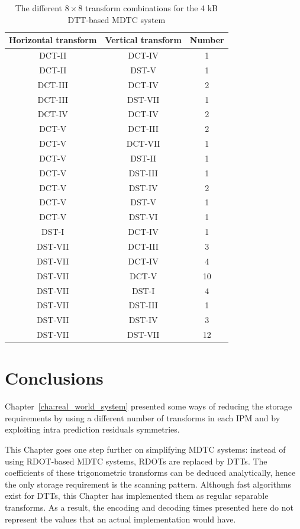 \documentclass[11pt,a4paper,openright,twoside]{book}
\numberwithin{equation}{section} %
\numberwithin{figure}{section} %
\numberwithin{table}{section} %
\begin{document}
\begin{table}[tb]
	\centering
	\small
	\begin{tabular}{cc|c}
		Horizontal transform & Vertical transform & Number \\
		\hline\hline
		DCT-II  & DCT-IV  & 1  \\
		DCT-II  & DST-V   & 1  \\
		DCT-III & DCT-IV  & 2  \\
		DCT-III & DST-VII & 1  \\
		DCT-IV  & DCT-IV  & 2  \\
		DCT-V   & DCT-III & 2  \\
		DCT-V   & DCT-VII & 1  \\
		DCT-V   & DST-II  & 1  \\
		DCT-V   & DST-III & 1  \\
		DCT-V   & DST-IV  & 2  \\
		DCT-V   & DST-V   & 1  \\
		DCT-V   & DST-VI  & 1  \\
		DST-I   & DCT-IV  & 1  \\
		DST-VII & DCT-III & 3  \\
		DST-VII & DCT-IV  & 4  \\
		DST-VII & DCT-V   & 10 \\
		DST-VII & DST-I   & 4  \\
		DST-VII & DST-III & 1  \\
		DST-VII & DST-IV  & 3  \\
		DST-VII & DST-VII & 12 \\
	\end{tabular}
	\caption{The different $8\times8$ transform combinations for the 4
	kB \acs{DTT}-based \acs{MDTC} system}
	\label{tab:dtt_combinations_8}
\end{table}

\section{Conclusions}
\label{sec:dtt_conclusions}

Chapter~\ref{cha:real_world_system} presented some ways of reducing the
storage requirements by using a different number of transforms in each
\ac{IPM} and by exploiting intra prediction residuals symmetries.

This Chapter goes one step further on simplifying \ac{MDTC} systems:
instead of using \ac{RDOT}-based \ac{MDTC} systems, \acp{RDOT} are replaced by
\acp{DTT}.
The coefficients of these trigonometric transforms can be deduced
analytically, hence the only storage requirement is the scanning pattern.
Although fast algorithms exist for \acp{DTT}, this Chapter has implemented
them as regular separable transforms.
As a result, the encoding and decoding times presented here do not represent
the values that an actual implementation would have.
\end{document}
